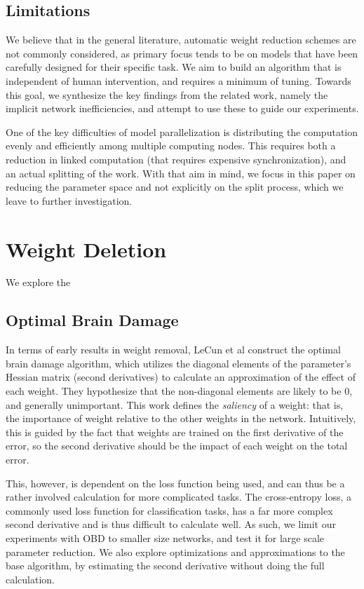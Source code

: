 \documentclass[10pt,twocolumn,letterpaper]{article}
\begin{document}
\subsection{Limitations}
We believe that in the general literature, automatic weight reduction schemes are not commonly considered, as primary focus tends to be on models that have been carefully designed for their specific task.
We aim to build an algorithm that is independent of human intervention, and requires a minimum of tuning.
Towards this goal, we synthesize the key findings from the related work, namely the implicit network inefficiencies, and attempt to use these to guide our experiments.

One of the key difficulties of model parallelization is distributing the computation evenly and efficiently among multiple computing nodes.
This requires both a reduction in linked computation (that requires expensive synchronization), and an actual splitting of the work.
With that aim in mind, we focus in this paper on reducing the parameter space and not explicitly on the split process, which we leave to further investigation.

\section{Weight Deletion}
We explore the 
\subsection{Optimal Brain Damage}
In terms of early results in weight removal, LeCun et al \cite{lecun1989optimal} construct the optimal brain damage algorithm, which utilizes the diagonal elements of the parameter's Hessian matrix (second derivatives) to calculate an approximation of the effect of each weight.
They hypothesize that the non-diagonal elements are likely to be 0, and generally unimportant.
This work defines the \emph{saliency} of a weight: that is, the importance of weight relative to the other weights in the network.
Intuitively, this is guided by the fact that weights are trained on the first derivative of the error, so the second derivative should be the impact of each weight on the total error.

This, however, is dependent on the loss function being used, and can thus be a rather involved calculation for more complicated tasks.
The cross-entropy loss, a commonly used loss function for classification tasks, has a far more complex second derivative and is thus difficult to calculate well.
As such, we limit our experiments with OBD to smaller size networks, and test it for large scale parameter reduction.
We also explore optimizations and approximations to the base algorithm, by estimating the second derivative without doing the full calculation.
\end{document}
